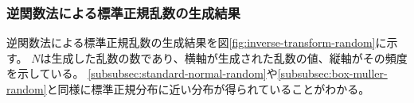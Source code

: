 

\subsubsection{逆関数法による標準正規乱数の生成結果}
逆関数法による標準正規乱数の生成結果を図\ref{fig:inverse-transform-random}に示す。
$N$は生成した乱数の数であり、横軸が生成された乱数の値、縦軸がその頻度を示している。
\ref{subsubsec:standard-normal-random}や\ref{subsubsec:box-muller-random}と同様に標準正規分布に近い分布が得られていることがわかる。


